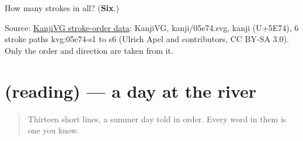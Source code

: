 \begin{tcolorbox}[breakable,colback=teal!4,colframe=teal!35!black,title={Before you move on}]
How many strokes in all? (\textbf{Six}.)

Source: \href{https://github.com/KanjiVG/kanjivg/blob/master/kanji/05e74.svg}{KanjiVG stroke-order data}: KanjiVG, kanji/05e74.svg, kanji  (U+5E74), 6 stroke paths kvg:05e74-s1 to s6 (Ulrich Apel and contributors, CC BY-SA 3.0). Only the order and direction are taken from it.
\end{tcolorbox}
\section[(reading)]{(reading) — a day at the river}

\label{lesson:JA-C253-kawa-no-hi}



\begin{quote}
Thirteen short lines, a summer day told in order. Every word in them is one you know.
\end{quote}

